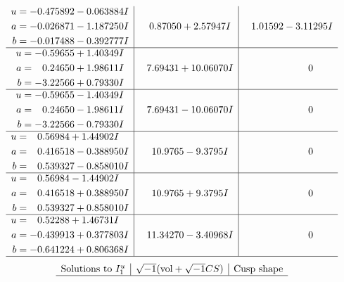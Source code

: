 \documentclass[1p]{elsarticle_modified}
\theoremstyle{definition}
\newcommand{\I}{\sqrt{-1}}
\begin{document}
$$\begin{array}{c|c|c}
\begin{aligned}
u &= -0.475892 - 0.063884 I \\
a &= -0.026871 - 1.187250 I \\
b &= -0.017488 - 0.392777 I\end{aligned}
 & \phantom{-}0.87050 + 2.57947 I & \phantom{-}1.01592 - 3.11295 I \\ \hline\begin{aligned}
u &= -0.59655 + 1.40349 I \\
a &= \phantom{-}0.24650 + 1.98611 I \\
b &= -3.22566 + 0.79330 I\end{aligned}
 & \phantom{-}7.69431 + 10.06070 I & \phantom{-0.000000 } 0 \\ \hline\begin{aligned}
u &= -0.59655 - 1.40349 I \\
a &= \phantom{-}0.24650 - 1.98611 I \\
b &= -3.22566 - 0.79330 I\end{aligned}
 & \phantom{-}7.69431 - 10.06070 I & \phantom{-0.000000 } 0 \\ \hline\begin{aligned}
u &= \phantom{-}0.56984 + 1.44902 I \\
a &= \phantom{-}0.416518 - 0.388950 I \\
b &= \phantom{-}0.539327 - 0.858010 I\end{aligned}
 & \phantom{-}10.9765 - 9.3795 I & \phantom{-0.000000 } 0 \\ \hline\begin{aligned}
u &= \phantom{-}0.56984 - 1.44902 I \\
a &= \phantom{-}0.416518 + 0.388950 I \\
b &= \phantom{-}0.539327 + 0.858010 I\end{aligned}
 & \phantom{-}10.9765 + 9.3795 I & \phantom{-0.000000 } 0 \\ \hline\begin{aligned}
u &= \phantom{-}0.52288 + 1.46731 I \\
a &= -0.439913 + 0.377803 I \\
b &= -0.641224 + 0.806368 I\end{aligned}
 & \phantom{-}11.34270 - 3.40968 I & \phantom{-0.000000 } 0\\
 \hline 
 \end{array}$$\newpage$$\begin{array}{c|c|c}  
\text{Solutions to }I^u_{1}& \I (\text{vol} + \sqrt{-1}CS) & \text{Cusp shape}\\
 \hline 

\end{array}$$
\end{document}
